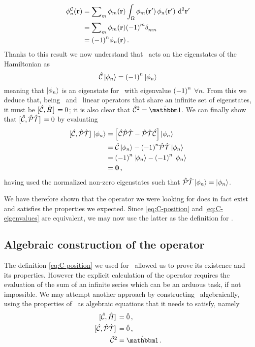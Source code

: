            \begin{align*}
                \phi_n^\mcC\pqty{\vb{r}}
                &= \sum\nolimits_m \phi_m\pqty{\vb{r}} \int\nolimits_\Omega \phi_m\pqty*{\vb{r}'} \phi_n\pqty*{\vb{r}'} \dd[3]{\vb{r}'} \\
                &= \sum\nolimits_m \phi_m\pqty{\vb{r}} \pqty{-1}^m \tensor{\delta}{_m_n} \\
                &= \pqty{-1}^n \phi_n\pqty{\vb{r}}\myperiod
            \end{align*}
            Thanks to this result we now understand that \hC\ acts on the eigenstates of the Hamiltonian as
            \begin{equation}
                \label{eq:C-eigenvalues}
                \hC\ket{\phi_n} = \pqty{-1}^n\ket{\phi_n}
            \end{equation}
            meaning that $\ket{\phi_n}$ is an eigenstate for \hC\ with eigenvalue $\pqty{-1}^n$ $\forall n$. From this we deduce that, being \hC\ and \hH\ linear operators that share an infinite set of eigenstates, it must be $\comm*{\hC}{\hH} = 0$; it is also clear that $\hC^2 = \hidM$. We can finally show that $\comm*{\hC}{\hPT} = 0$ by evaluating
            \begin{align*}
                \comm*{\hC}{\hPT}\ket{\phi_n}
                & = \bqty{\hC\hPT - \hPT\hC}\ket{\phi_n}\\
                & = \hC\ket{\phi_n} - \pqty{-1}^n\hPT\ket{\phi_n}\\
                & = \pqty{-1}^n \ket{\phi_n} - \pqty{-1}^n \ket{\phi_n}\\
                & = \vb{0}
                \mycomma
            \end{align*}
            having used the normalized non-zero eigenstates such that $\mathcal{\hat{P}}\mathcal{\hat{T}}\ket{\phi_n} = \ket{\phi_n}$.

            We have therefore shown that the operator we were looking for does in fact exist and satisfies the properties we expected. Since \eqref{eq:C-position} and \eqref{eq:C-eigenvalues} are equivalent, we may now use the latter as the definition for \hC.

        \subsection{Algebraic construction of the \texorpdfstring{\hC}{C} operator}
            The definition \eqref{eq:C-position} we used for \hC\ allowed us to prove its existence and its properties. However the explicit calculation of the operator requires the evaluation of the sum of an infinite series which can be an arduous task, if not impossible. We may attempt another approach \cite{bender2024} by constructing \hC\ algebraically, using the properties of \hC\ as algebraic equations that it needs to satisfy, namely
            \begin{align*}
                \comm*{\hC}{\hH} &= \hzero 
                \mycomma \\
                \comm*{\hC}{\hPT} &= \hzero 
                \mycomma \\
                \hC^2 &= \hidM
                \myperiod
            \end{align*}
            
